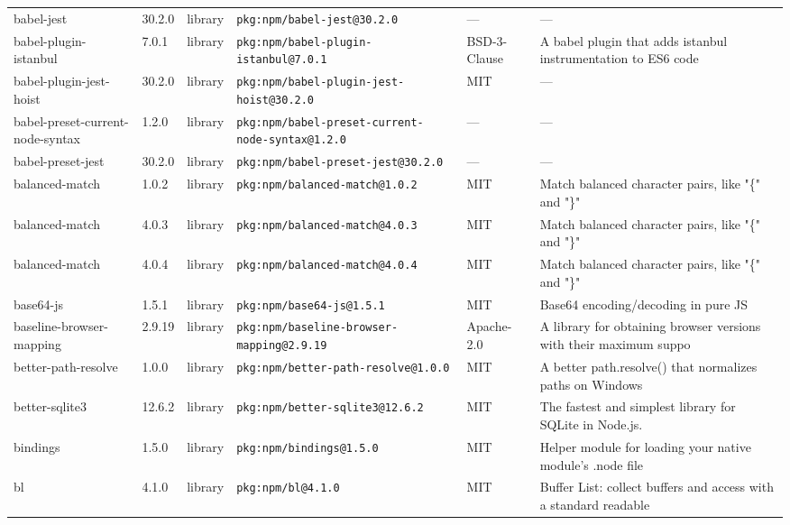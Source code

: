 \documentclass[11pt,a4paper]{article}
\begin{document}
\begin{longtable}{|p{4cm}|p{2cm}|p{1.6cm}|p{5cm}|p{1.5cm}|p{3.5cm}|}
\raggedright babel-jest & 30.2.0 & library & \small\texttt{pkg:npm/babel-jest@30.2.0} & — & \small — \\
\raggedright babel-plugin-istanbul & 7.0.1 & library & \small\texttt{pkg:npm/babel-plugin-istanbul@7.0.1} & BSD-3-Clause & \small A babel plugin that adds istanbul instrumentation to ES6 code \\
\raggedright babel-plugin-jest-hoist & 30.2.0 & library & \small\texttt{pkg:npm/babel-plugin-jest-hoist@30.2.0} & MIT & \small — \\
\raggedright babel-preset-current-node-syntax & 1.2.0 & library & \small\texttt{pkg:npm/babel-preset-current-node-syntax@1.2.0} & — & \small — \\
\raggedright babel-preset-jest & 30.2.0 & library & \small\texttt{pkg:npm/babel-preset-jest@30.2.0} & — & \small — \\
\raggedright balanced-match & 1.0.2 & library & \small\texttt{pkg:npm/balanced-match@1.0.2} & MIT & \small Match balanced character pairs, like "\{" and "\}" \\
\raggedright balanced-match & 4.0.3 & library & \small\texttt{pkg:npm/balanced-match@4.0.3} & MIT & \small Match balanced character pairs, like "\{" and "\}" \\
\raggedright balanced-match & 4.0.4 & library & \small\texttt{pkg:npm/balanced-match@4.0.4} & MIT & \small Match balanced character pairs, like "\{" and "\}" \\
\raggedright base64-js & 1.5.1 & library & \small\texttt{pkg:npm/base64-js@1.5.1} & MIT & \small Base64 encoding/decoding in pure JS \\
\raggedright baseline-browser-mapping & 2.9.19 & library & \small\texttt{pkg:npm/baseline-browser-mapping@2.9.19} & Apache-2.0 & \small A library for obtaining browser versions with their maximum suppo \\
\raggedright better-path-resolve & 1.0.0 & library & \small\texttt{pkg:npm/better-path-resolve@1.0.0} & MIT & \small A better path.resolve() that normalizes paths on Windows \\
\raggedright better-sqlite3 & 12.6.2 & library & \small\texttt{pkg:npm/better-sqlite3@12.6.2} & MIT & \small The fastest and simplest library for SQLite in Node.js. \\
\raggedright bindings & 1.5.0 & library & \small\texttt{pkg:npm/bindings@1.5.0} & MIT & \small Helper module for loading your native module's .node file \\
\raggedright bl & 4.1.0 & library & \small\texttt{pkg:npm/bl@4.1.0} & MIT & \small Buffer List: collect buffers and access with a standard readable  \\

\end{longtable}
\end{document}
